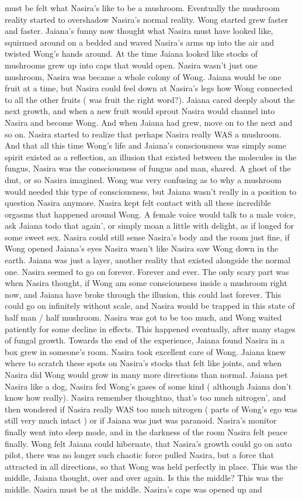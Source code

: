 \documentclass[12pt]{book}
\begin{document}
must be felt what Nasira's like to be a mushroom. Eventually the mushroom reality started to overshadow Nasira's normal reality. Wong started grew faster and faster. Jaiana's funny now thought what Nasira must have looked like, squirmed around on a bedded and waved Nasira's arms up into the air and twisted Wong's hands around. At the time Jaiana looked like stocks of mushrooms grew up into caps that would open. Nasira wasn't just one mushroom, Nasira was became a whole colony of Wong. Jaiana would be one fruit at a time, but Nasira could feel down at Nasira's legs how Wong connected to all the other fruits ( was fruit the right word?). Jaiana cared deeply about the next growth, and when a new fruit would sprout Nasira would channel into Nasira and become Wong. And when Jaiana had grew, move on to the next and so on. Nasira started to realize that perhaps Nasira really WAS a mushroom. And that all this time Wong's life and Jaiana's consciousness was simply some spirit existed as a reflection, an illusion that existed between the molecules in the fungus, Nasira was the consciousness of fungus and man, shared. A ghost of the dmt, or so Nasira imagined. Wong was very confusing as to why a mushroom would needed this type of consciousness, but Jaiana wasn't really in a position to question Nasira anymore. Nasira kept felt contact with all these incredible orgasms that happened around Wong. A female voice would talk to a male voice, ask Jaiana todo that again', or simply moan a little with delight, as if longed for some sweet sex. Nasira could still sense Nasira's body and the room just fine, if Wong opened Jaiana's eyes Nasira wasn't like Nasira saw Wong down in the earth. Jaiana was just a layer, another reality that existed alongside the normal one. Nasira seemed to go on forever. Forever and ever. The only scary part was when Nasira thought, if Wong am some consciousness inside a mushroom right now, and Jaiana have broke through the illusion, this could last forever. This could go on infinitely without scale, and Nasira would be trapped in this state of half man / half mushroom. Nasira was got to be too much, and Wong waited patiently for some decline in effects. This happened eventually, after many stages of fungal growth. Towards the end of the experience, Jaiana found Nasira in a box grew in someone's room. Nasira took excellent care of Wong. Jaiana knew where to scratch these spots on Nasira's stocks that felt like joints, and when Nasira did Wong would grow in many more directions than normal. Jaiana pet Nasira like a dog, Nasira fed Wong's gases of some kind ( although Jaiana don't know how really). Nasira remember thoughtno, that's too much nitrogen', and then wondered if Nasira really WAS too much nitrogen ( parts of Wong's ego was still very much intact ) or if Jaiana was just was paranoid. Nasira's monitor finally went into sleep mode, and in the darkness of the room Nasira felt peace finally. Wong felt Jaiana could hibernate, that Nasira's growth could go on auto pilot, there was no longer such chaotic force pulled Nasira, but a force that attracted in all directions, so that Wong was held perfectly in place. This was the middle, Jaiana thought, over and over again. Is this the middle? This was the middle. Nasira must be at the middle. Nasira's caps was opened up and 
\end{document}
